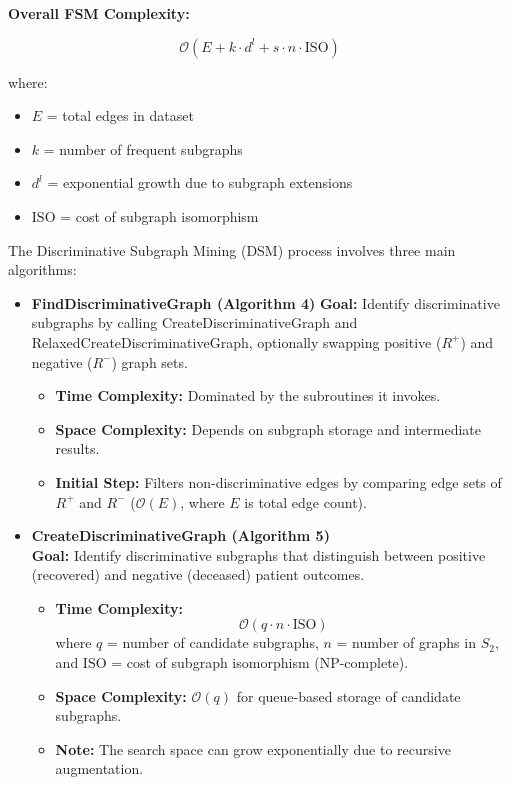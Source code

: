 \documentclass[11pt]{article}
\begin{document}
\textbf{Overall FSM Complexity:}

\[
\mathcal{O}(E + k \cdot d^l + s \cdot n \cdot \text{ISO})
\]

\noindent where:
\begin{itemize}[noitemsep]
    \item $E$ = total edges in dataset
    \item $k$ = number of frequent subgraphs
    \item $d^l$ = exponential growth due to subgraph extensions
    \item $\text{ISO}$ = cost of subgraph isomorphism
\end{itemize}
\vspace{1cm}
The Discriminative Subgraph Mining (DSM) process involves three main algorithms:
  
\begin{itemize}[noitemsep]
    \item \textbf{FindDiscriminativeGraph (Algorithm 4)}
\textbf{Goal:} Identify discriminative subgraphs by calling CreateDiscriminativeGraph and RelaxedCreateDiscriminativeGraph, optionally swapping positive ($R^+$) and negative ($R^-$) graph sets.

\begin{itemize}[noitemsep]
    \item \textbf{Time Complexity:} Dominated by the subroutines it invokes.
    \item \textbf{Space Complexity:} Depends on subgraph storage and intermediate results.
    \item \textbf{Initial Step:} Filters non-discriminative edges by comparing edge sets of $R^+$ and $R^-$ ($\mathcal{O}(E)$, where $E$ is total edge count).\\
\end{itemize}

    \item \textbf{CreateDiscriminativeGraph (Algorithm 5)} \\
    \textbf{Goal:} Identify discriminative subgraphs that distinguish between positive (recovered) and negative (deceased) patient outcomes.
    \begin{itemize}[noitemsep]
        \item \textbf{Time Complexity:} 
        \[
        \mathcal{O}(q \cdot n \cdot \text{ISO})
        \]
        where $q$ = number of candidate subgraphs, $n$ = number of graphs in $S_2$, and $\text{ISO}$ = cost of subgraph isomorphism (NP-complete).
        \item \textbf{Space Complexity:} $\mathcal{O}(q)$ for queue-based storage of candidate subgraphs.
        \item \textbf{Note:} The search space can grow exponentially due to recursive augmentation. \\ 
    \end{itemize}
    

\end{itemize}
\end{document}
